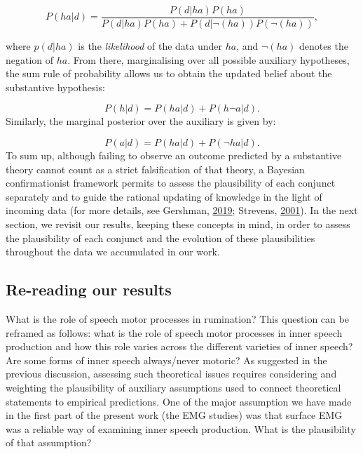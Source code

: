 \documentclass[a4paper,12pt,twoside,openright,oldfontcommands]{memoir}
\begin{document}
\[
P(h a | d) = \frac{P(d | h a) P(h a)}{P(d | h a) P(h a)+P(d | \neg(h a)) P(\neg(h a))},
\]

where \(p(d|ha)\) is the \emph{likelihood} of the data under \(ha\), and \(\lnot (ha)\) denotes the negation of \(ha\). From there, marginalising over all possible auxiliary hypotheses, the sum rule of probability allows us to obtain the updated belief about the substantive hypothesis:

\[P(h | d) = P(h a | d) + P(h \neg a | d).\]
Similarly, the marginal posterior over the auxiliary is given by:

\[P(a | d) = P(h a | d) + P(\neg h a | d).\]
To sum up, although failing to observe an outcome predicted by a substantive theory cannot count as a strict falsification of that theory, a Bayesian confirmationist framework permits to assess the plausibility of each conjunct separately and to guide the rational updating of knowledge in the light of incoming data (for more details, see Gershman, \protect\hyperlink{ref-gershman_how_2019}{2019}; Strevens, \protect\hyperlink{ref-strevens_bayesian_2001}{2001}). In the next section, we revisit our results, keeping these concepts in mind, in order to assess the plausibility of each conjunct and the evolution of these plausibilities throughout the data we accumulated in our work.

\hypertarget{re-reading-our-results}{%
\subsection{Re-reading our results}\label{re-reading-our-results}}

What is the role of speech motor processes in rumination? This question can be reframed as follows: what is the role of speech motor processes in inner speech production and how this role varies across the different varieties of inner speech? Are some forms of inner speech always/never motoric? As suggested in the previous discussion, assessing such theoretical issues requires considering and weighting the plausibility of auxiliary assumptions used to connect theoretical statements to empirical predictions. One of the major assumption we have made in the first part of the present work (the EMG studies) was that surface EMG was a reliable way of examining inner speech production. What is the plausibility of that assumption?
\end{document}
